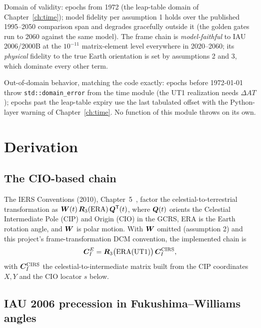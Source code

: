 Domain of validity: epochs from 1972 (the leap-table domain of
Chapter~\ref{ch:time}); model fidelity per assumption 1 holds over the
published 1995--2050 comparison span and degrades gracefully outside it
(the golden gates run to 2060 against the same model). The frame chain is
\emph{model-faithful} to IAU 2006/2000B at the $10^{-11}$ matrix-element
level everywhere in 2020--2060; its \emph{physical} fidelity to the true
Earth orientation is set by assumptions 2 and 3, which dominate every
other term.

Out-of-domain behavior, matching the code exactly: epochs before
1972-01-01 throw \texttt{std::domain\_error} from the time module (the
UT1 realization needs $\Delta AT$); epochs past the leap-table expiry use
the last tabulated offset with the Python-layer warning of
Chapter~\ref{ch:time}. No function of this module throws on its own.

\section{Derivation}
\label{sec:frames:derivation}

\subsection{The CIO-based chain}

The IERS Conventions (2010), Chapter~5~\cite{iers2010}, factor the
celestial-to-terrestrial transformation as $\bm{W}(t)\, \bm{R}_3(
\mathrm{ERA})\, \bm{Q}^{\mathsf T}(t)$, where $\bm{Q}(t)$ orients the
Celestial Intermediate Pole (CIP) and Origin (CIO) in the GCRS, ERA is the
Earth rotation angle, and $\bm{W}$ is polar motion. With $\bm{W}$
omitted (assumption 2) and this project's frame-transformation DCM
convention, the implemented chain is
\begin{equation}
  \bm{C}_{I}^{E} = \bm{R}_3\bigl(\mathrm{ERA}(\mathrm{UT1})\bigr)\,
               \bm{C}_{I}^{\mathrm{CIRS}},
  \label{eq:frames:chain}
\end{equation}
with $\bm{C}_{I}^{\mathrm{CIRS}}$ the celestial-to-intermediate matrix built
from the CIP coordinates $X, Y$ and the CIO locator $s$ below.

\subsection{IAU 2006 precession in Fukushima--Williams angles}

